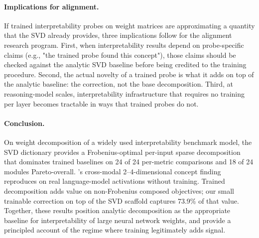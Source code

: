 \paragraph{Implications for alignment.} If trained interpretability probes on weight matrices are approximating a quantity that the SVD already provides, three implications follow for the alignment research program. First, when interpretability results depend on probe-specific claims (e.g., "the trained probe found this concept"), those claims should be checked against the analytic SVD baseline before being credited to the training procedure. Second, the actual novelty of a trained probe is what it adds on top of the analytic baseline: the correction, not the base decomposition. Third, at reasoning-model scales, interpretability infrastructure that requires no training per layer becomes tractable in ways that trained probes do not.

\paragraph{Conclusion.} On weight decomposition of a widely used interpretability benchmark model, the SVD dictionary provides a Frobenius-optimal per-input sparse decomposition that dominates trained baselines on 24 of 24 per-metric comparisons and 18 of 24 modules Pareto-overall. \bsf's cross-modal 2--4-dimensional concept finding reproduces on real language-model activations without training. Trained decomposition adds value on non-Frobenius composed objectives; our small trainable correction on top of the SVD scaffold captures 73.9\% of that value. Together, these results position analytic decomposition as the appropriate baseline for interpretability of large neural network weights, and provide a principled account of the regime where training legitimately adds signal.
